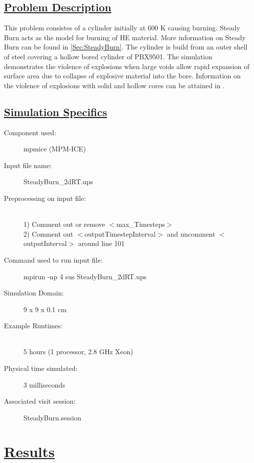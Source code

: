 \subsection*{\underline{Problem Description}}
This problem consistes of a cylinder initially at 600 K causing burning.  Steady Burn acts as the model for burning of HE material.  More information on Steady Burn can be found in \ref{Sec:SteadyBurn}.  The cylinder is build from an outer shell of steel covering a hollow bored cylinder of PBX9501.  The simulation demonstrates the violence of explosions when large voids allow rapid expansion of surface area due to collapse of explosive material into the bore.  Information on the violence of explosions with solid and hollow cores can be attained in \cite{ref:wighteddings}.  

\subsection*{\underline{Simulation Specifics}}
\begin{description}
\item [Component used:] \hfill mpmice (MPM-ICE)
\item [Input file name:] \hfill SteadyBurn\_2dRT.ups
\item [Preprocessing on input file:]\hfill \\ 1) Comment out or remove $<$max\_Timesteps$>$ \\ 2) Comment out $<$outputTimestepInterval$>$ and uncomment $<$outputInterval$>$ around line 101 \\
\item [Command used to run input file:]\hfill mpirun -np 4 sus SteadyBurn\_2dRT.ups

\item [Simulation Domain:]\hfill    9 x 9 x 0.1 cm

\item [Example Runtimes:] \hfill \\
 5 hours   (1 processor, 2.8 GHz Xeon)

\item [Physical time simulated:] \hfill 3 milliseconds \\ 


\item [Associated visit session:] \hfill SteadyBurn.session

\end{description}

\newpage

\section*{\underline{Results}}

